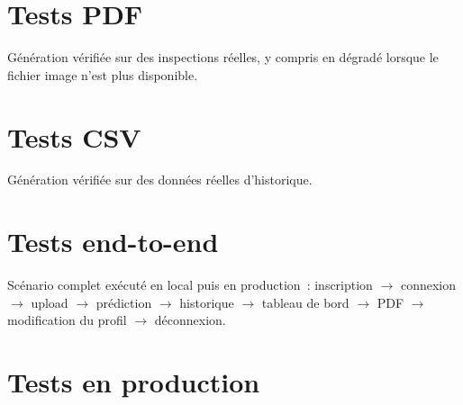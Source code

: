 \section{Tests PDF}

G\'en\'eration v\'erifi\'ee sur des inspections r\'eelles, y compris en d\'egrad\'e lorsque le fichier image n'est plus disponible.

\section{Tests CSV}

G\'en\'eration v\'erifi\'ee sur des donn\'ees r\'eelles d'historique.

\section{Tests end-to-end}

Sc\'enario complet ex\'ecut\'e en local puis en production~: inscription $\rightarrow$ connexion $\rightarrow$ upload $\rightarrow$ pr\'ediction $\rightarrow$ historique $\rightarrow$ tableau de bord $\rightarrow$ PDF $\rightarrow$ modification du profil $\rightarrow$ d\'econnexion.

\section{Tests en production}

